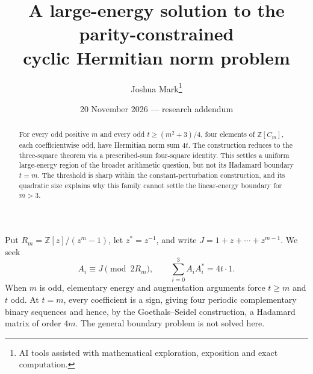 \documentclass[11pt]{article}
\title{A large-energy solution to the parity-constrained\protect\\cyclic Hermitian norm problem}
\author{Joshua Mark\thanks{AI tools assisted with mathematical exploration, exposition and exact computation.}}
\date{20 November 2026 --- research addendum}
\newcommand{\Z}{\mathbb Z}
\begin{document}
\maketitle
\begin{abstract}
For every odd positive $m$ and every odd
$t\ge(m^2+3)/4$, four elements of $\Z[C_m]$, each coefficientwise
odd, have Hermitian norm sum $4t$. The construction reduces to the
three-square theorem via a prescribed-sum four-square identity. This
settles a uniform large-energy region of the broader arithmetic question,
but not its Hadamard boundary $t=m$. The threshold is sharp within the
constant-perturbation construction, and its quadratic size explains why
this family cannot settle the linear-energy boundary for $m>3$.
\end{abstract}

Put $R_m=\Z[z]/(z^m-1)$, let $z^*=z^{-1}$, and write
$J=1+z+\cdots+z^{m-1}$. We seek
\begin{equation}\label{eq:target}
 A_i\equiv J\pmod{2R_m},\qquad
 \sum_{i=0}^3A_iA_i^*=4t\cdot1.
\end{equation}
When $m$ is odd, elementary energy and augmentation arguments force
$t\ge m$ and $t$ odd. At $t=m$, every coefficient is a sign, giving
four periodic complementary binary sequences and hence, by the
Goethals--Seidel construction, a Hadamard matrix of order $4m$.
The general boundary problem is not solved here.
\end{document}
